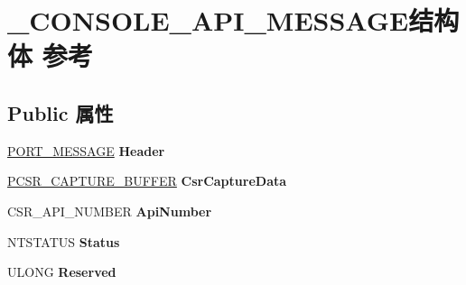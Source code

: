 \hypertarget{struct___c_o_n_s_o_l_e___a_p_i___m_e_s_s_a_g_e}{}\section{\+\_\+\+C\+O\+N\+S\+O\+L\+E\+\_\+\+A\+P\+I\+\_\+\+M\+E\+S\+S\+A\+G\+E结构体 参考}
\label{struct___c_o_n_s_o_l_e___a_p_i___m_e_s_s_a_g_e}
\subsection*{Public 属性}
\begin{DoxyCompactItemize}
\item 
\mbox{\label{struct___c_o_n_s_o_l_e___a_p_i___m_e_s_s_a_g_e_abe5f2df98d02278495024dd14b6d49bd}} 
\hyperlink{struct___p_o_r_t___m_e_s_s_a_g_e___h_e_a_d_e_r}{P\+O\+R\+T\+\_\+\+M\+E\+S\+S\+A\+GE} {\bfseries Header}
\item 
\mbox{\label{struct___c_o_n_s_o_l_e___a_p_i___m_e_s_s_a_g_e_ace4725ff9082886f79ac4a5600d1003a}} 
\hyperlink{struct___c_s_r___c_a_p_t_u_r_e___b_u_f_f_e_r}{P\+C\+S\+R\+\_\+\+C\+A\+P\+T\+U\+R\+E\+\_\+\+B\+U\+F\+F\+ER} {\bfseries Csr\+Capture\+Data}
\item 
\mbox{\label{struct___c_o_n_s_o_l_e___a_p_i___m_e_s_s_a_g_e_ab92311e12e0b2a6d2f12ad1aaf823c34}} 
C\+S\+R\+\_\+\+A\+P\+I\+\_\+\+N\+U\+M\+B\+ER {\bfseries Api\+Number}
\item 
\mbox{\label{struct___c_o_n_s_o_l_e___a_p_i___m_e_s_s_a_g_e_a32733bcce9162a440eefe8d57ab3965a}} 
N\+T\+S\+T\+A\+T\+US {\bfseries Status}
\item 
\mbox{\label{struct___c_o_n_s_o_l_e___a_p_i___m_e_s_s_a_g_e_aaa7e0df8d785b65540f0ebf6f88106a1}} 
U\+L\+O\+NG {\bfseries Reserved}
\item 
\mbox{\label{struct___c_o_n_s_o_l_e___a_p_i___m_e_s_s_a_g_e_acc52381e08dccb491518a09fb9c0acdb}} 

\end{DoxyCompactItemize}
